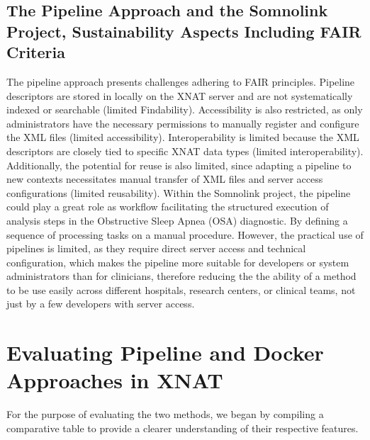 \subsection{The Pipeline Approach and the Somnolink Project, Sustainability Aspects Including FAIR Criteria}
The pipeline approach presents challenges adhering to FAIR principles.
Pipeline descriptors are stored in locally on the XNAT server and are not systematically indexed or searchable (limited Findability).
 Accessibility is also restricted, as only administrators have the necessary permissions to manually register and configure the XML files (limited accessibility).
 Interoperability is limited because the XML descriptors are closely tied to specific XNAT data types (limited interoperability). Additionally, the potential for reuse is also limited, since adapting a pipeline to new contexts necessitates manual transfer of XML files and server access configurations (limited reusability). Within the Somnolink project, the pipeline could play a great role as workflow  facilitating the structured execution of analysis steps in the Obstructive Sleep Apnea (OSA) diagnostic. By defining a sequence of processing tasks on a manual procedure. However, the practical use of pipelines is limited, as they require direct server access and technical configuration, which makes the pipeline more suitable for developers or system administrators than for clinicians, therefore reducing the the ability of a method to be use easily across different hospitals, research centers, or clinical teams, not just by a few developers with server access.


\section{Evaluating Pipeline and Docker Approaches in XNAT}

For the purpose of evaluating the two methods, we began by compiling a comparative table to provide a clearer understanding of their respective features.

